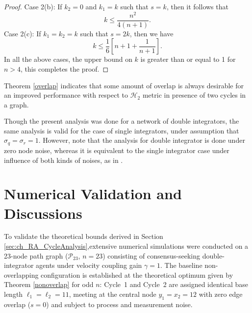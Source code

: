 \begin{proof}
Case 2(b): If $k_2=0$ and $k_1=k$ such that $s=k$, then it follows that
\begin{equation}
	k \le \frac{n^2}{4(n+1)}.
\end{equation}
Case 2(c): If $k_1=k_2=k$ such that $s=2k$, then we have
\begin{equation}
	k \le \frac{1}{6}\left[n+1+\frac{1}{n+1}\right].
\end{equation}
In all the above cases, the upper bound on $k$ is greater than or equal to 1 for $n>4$, this completes the proof.    
\end{proof}
\begin{remark}
Theorem \ref{overlap} indicates that some amount of overlap is always desirable for an improved performance with respect to $\mathcal{H}_2$ metric in presence of two cycles in a graph.
\end{remark}
\begin{remark}
Though the present analysis was done for a network of double integrators, the same analysis is valid for the case of single integrators, under assumption that $\sigma_q=\sigma_r=1$. However, note that the analysis for double integrator is done under zero node noise, whereas it is equivalent to the single integrator case under influence of both kinds of noises, as in \cite{zelazo2013performance}.
\end{remark}

\section{Numerical Validation and Discussions}\label{sec:ch_RA_simulations}

To validate the theoretical bounds derived in Section \ref{sec:ch_RA_CycleAnalysis},extensive numerical simulations were conducted on a 23-node path graph ($\mathcal{P}_{23}$, $n = 23$) consisting of consensus-seeking double-integrator agents under velocity coupling gain $\gamma = 1$. The baseline non-overlapping configuration is established at the theoretical optimum given by Theorem \ref{nonoverlap} for odd $n$: Cycle~1 and Cycle~2 are assigned identical base length $\ell_1=\ell_2=11$, meeting at the central node $y_1 = x_2 = 12$ with zero edge overlap ($s=0$) and subject to process and measurement noise.

